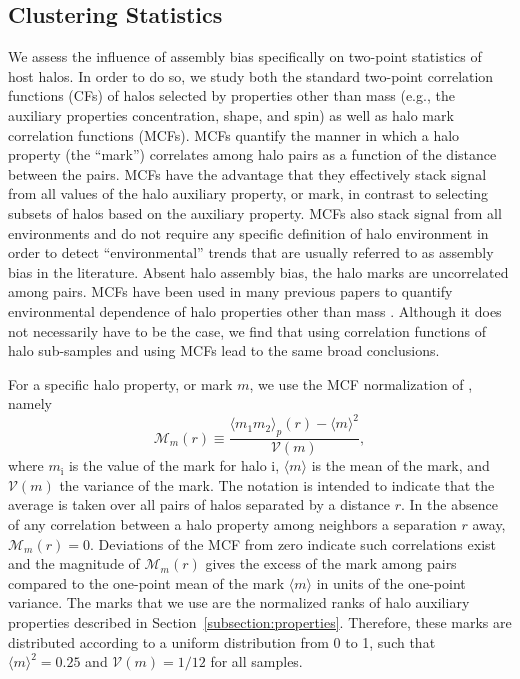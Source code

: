 \documentclass[usenatbib,fleqn]{mnras}
\begin{document}
\subsection{Clustering Statistics}
\label{subsection:clusteringstatistics}


We assess the influence of assembly bias specifically on two-point statistics of host halos. In order to do so, we study both the standard two-point correlation functions (CFs) of halos selected by properties other than mass (e.g., the auxiliary properties concentration, shape, and spin) as well as halo mark correlation functions (MCFs). MCFs quantify the manner in which a halo property (the ``mark'') correlates among halo pairs as a function of the distance between the pairs. MCFs have the advantage that they effectively stack signal from all values of the halo auxiliary property, or mark, in contrast to selecting subsets of halos based on the auxiliary property. MCFs also stack signal from all environments and do not require any specific definition of halo environment in order to detect ``environmental'' trends that are usually referred to as assembly bias in the literature. Absent halo assembly bias, the halo marks are uncorrelated among pairs. MCFs have been used in many previous papers to quantify environmental dependence of halo properties other than mass \citep{sheth_tormen04,sheth05, harker_etal06,wechsler_etal06,mao_etal15}. 
Although it does not necessarily have to be the case, we find that using correlation functions of halo sub-samples and using MCFs lead to the same broad conclusions. 

For a specific halo property, or mark $m$, we use the MCF normalization of \citet{wechsler_etal06}, namely 
%
\begin{equation}
\label{eq:mcf}
\mathcal{M}_m(r) \equiv \frac{\langle m_1 m_2 \rangle_p (r) - 
\langle m \rangle^2}{\mathcal{V}(m)},
\end{equation}
%
where $m_{\mathrm{i}}$ is the value of the mark for halo $\mathrm{i}$, $\langle m \rangle$ is the mean of the mark, and $\mathcal{V}(m)$ the variance of the mark. The notation is intended to indicate that the average is taken over all pairs of halos separated by a distance $r$. In the absence of any correlation between a halo
property among neighbors a separation $r$ away, $\mathcal{M}_m(r) = 0$. Deviations of the MCF from zero indicate such correlations exist and the magnitude of $\mathcal{M}_m(r)$ gives the excess of the mark among pairs compared to the one-point mean of the mark $\langle m\rangle$ in units of the one-point variance. The marks that we use are the normalized ranks of halo auxiliary properties described in Section~\ref{subsection:properties}. Therefore, these marks are distributed according 
to a uniform distribution from 0 to 1, such that $\langle m \rangle^2 = 0.25$ and $\mathcal{V}(m) = 1/12$ for all samples.
\end{document}
